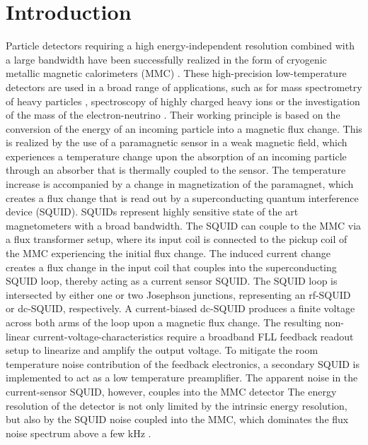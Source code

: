 \chapter{Introduction}

Particle detectors requiring a high energy-independent resolution combined with a large bandwidth have been successfully realized in the form of cryogenic metallic magnetic calorimeters (MMC) \cite{Enss2005a}. These high-precision low-temperature detectors are used in a broad range of applications, such as for mass spectrometry of heavy particles \cite{Hengstler2017}, spectroscopy of highly charged heavy ions \cite{Gamer2919} or the investigation of the mass of the electron-neutrino \cite{Gastaldo2017}. Their working principle is based on the conversion of the energy of an incoming particle into a magnetic flux change. This is realized by the use of a paramagnetic sensor in a weak magnetic field, which experiences a temperature change upon the absorption of an incoming particle through an absorber that is thermally coupled to the sensor. The temperature increase is accompanied by a change in magnetization of the paramagnet, which creates a flux change that is read out by a superconducting quantum interference device (SQUID). SQUIDs represent highly sensitive state of the art magnetometers with a broad bandwidth. The SQUID can couple to the MMC via a flux transformer setup, where its input coil is connected to the pickup coil of the MMC experiencing the initial flux change. The induced current change creates a flux change in the input coil that couples into the superconducting SQUID loop, thereby acting as a current sensor SQUID. The SQUID loop is intersected by either one or two Josephson junctions, representing an rf-SQUID or dc-SQUID, respectively. A current-biased dc-SQUID produces a finite voltage across both arms of the loop upon a magnetic flux change. The resulting non-linear current-voltage-characteristics require a broadband FLL feedback readout setup to linearize and amplify the output voltage. To mitigate the room temperature noise contribution of the feedback electronics, a secondary SQUID is implemented to act as a low temperature preamplifier. The apparent noise in the current-sensor SQUID, however, couples into the MMC detector  
The energy resolution of the detector is not only limited by the intrinsic energy resolution, but also by the SQUID noise coupled into the MMC, which dominates the flux noise spectrum above a few kHz \cite{Kempf2018}.     